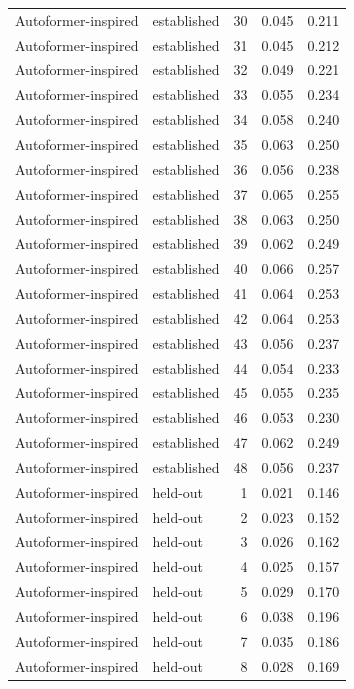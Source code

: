 \begin{tabular}{llrrr}
Autoformer-inspired & established & 30 & 0.045 & 0.211 \\
Autoformer-inspired & established & 31 & 0.045 & 0.212 \\
Autoformer-inspired & established & 32 & 0.049 & 0.221 \\
Autoformer-inspired & established & 33 & 0.055 & 0.234 \\
Autoformer-inspired & established & 34 & 0.058 & 0.240 \\
Autoformer-inspired & established & 35 & 0.063 & 0.250 \\
Autoformer-inspired & established & 36 & 0.056 & 0.238 \\
Autoformer-inspired & established & 37 & 0.065 & 0.255 \\
Autoformer-inspired & established & 38 & 0.063 & 0.250 \\
Autoformer-inspired & established & 39 & 0.062 & 0.249 \\
Autoformer-inspired & established & 40 & 0.066 & 0.257 \\
Autoformer-inspired & established & 41 & 0.064 & 0.253 \\
Autoformer-inspired & established & 42 & 0.064 & 0.253 \\
Autoformer-inspired & established & 43 & 0.056 & 0.237 \\
Autoformer-inspired & established & 44 & 0.054 & 0.233 \\
Autoformer-inspired & established & 45 & 0.055 & 0.235 \\
Autoformer-inspired & established & 46 & 0.053 & 0.230 \\
Autoformer-inspired & established & 47 & 0.062 & 0.249 \\
Autoformer-inspired & established & 48 & 0.056 & 0.237 \\
Autoformer-inspired & held-out & 1 & 0.021 & 0.146 \\
Autoformer-inspired & held-out & 2 & 0.023 & 0.152 \\
Autoformer-inspired & held-out & 3 & 0.026 & 0.162 \\
Autoformer-inspired & held-out & 4 & 0.025 & 0.157 \\
Autoformer-inspired & held-out & 5 & 0.029 & 0.170 \\
Autoformer-inspired & held-out & 6 & 0.038 & 0.196 \\
Autoformer-inspired & held-out & 7 & 0.035 & 0.186 \\
Autoformer-inspired & held-out & 8 & 0.028 & 0.169 \\

\end{tabular}
